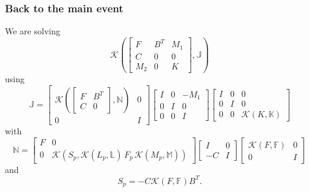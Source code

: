 \documentclass[presentation]{beamer}
\newcommand{\KSP}[2]{\ensuremath{\mathcal{K}\left(#1, \mathbb{#2}\right)}}
\newcommand{\ksp}[1]{\KSP{#1}{#1}}
\begin{document}
\begin{frame}
  \frametitle{Back to the main event}
  We are solving
  \begin{equation*}
    \KSP{\begin{bmatrix}
        F & B^T & M_1\\
        C & 0 & 0 \\
        M_2 & 0 & K
      \end{bmatrix}}{J}
  \end{equation*}
  using
  \begin{equation*}
    \mathbb{J} =
    \begin{bmatrix}
      \KSP{\begin{bmatrix}
          F & B^T\\
          C & 0
        \end{bmatrix}}{N} & 0\\
      0 & I
    \end{bmatrix}
    \begin{bmatrix}
      I & 0 & -M_1\\
      0 & I & 0 \\
      0 & 0 & I
    \end{bmatrix}
    \begin{bmatrix}
      I & 0 & 0\\
      0 & I & 0\\
      0 & 0 &\ksp{K}
    \end{bmatrix}
  \end{equation*}
  with
  \begin{equation*}
    \mathbb{N} = \begin{bmatrix}
      F & 0 \\
      0 & \mathcal{K}(S_p, \KSP{L_p}{L}\,F_p \, \KSP{M_p}{M})
    \end{bmatrix}
    \begin{bmatrix}
      I & 0\\
      -C & I
    \end{bmatrix}
    \begin{bmatrix}
      \ksp{F} & 0 \\
      0 & I
    \end{bmatrix}
  \end{equation*}
  and
  \begin{equation*}
    S_p = -C \ksp{F} B^T.
  \end{equation*}
\end{frame}
\end{document}

